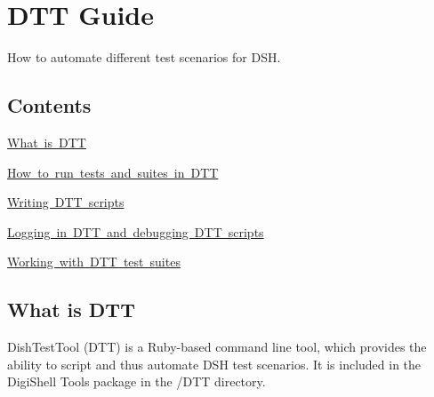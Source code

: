 \hypertarget{a00836}{}\section{D\+TT Guide}
\label{a00836}
How to automate different test scenarios for D\+SH. 

\hypertarget{a00836_dtt_guide_contents}{}\subsection{Contents}\label{a00836_dtt_guide_contents}
\begin{DoxyItemize}
\item \mbox{\hyperlink{a00836_dtt_guide_00_what_is_dtt}{What is D\+TT}} \item \mbox{\hyperlink{a00836_dtt_guide_01_how_to_run_test_and_suites_in_dtt}{How to run tests and suites in D\+TT}} \item \mbox{\hyperlink{a00836_dtt_guide_03_writing_dtt_scripts}{Writing D\+TT scripts}} \item \mbox{\hyperlink{a00836_dtt_guide_04_logging_in_dtt_and_debuggin_dtt_scripts}{Logging in D\+TT and debugging D\+TT scripts}} \item \mbox{\hyperlink{a00836_dtt_guide_02_working_with_dtt_test_suites}{Working with D\+TT test suites}}\end{DoxyItemize}
 \hypertarget{a00836_dtt_guide_00_what_is_dtt}{}\subsection{What is D\+TT}\label{a00836_dtt_guide_00_what_is_dtt}
 Dish\+Test\+Tool (D\+TT) is a Ruby-\/based command line tool, which provides the ability to script and thus automate D\+SH test scenarios. It is included in the Digi\+Shell Tools package in the /\+D\+TT directory.

